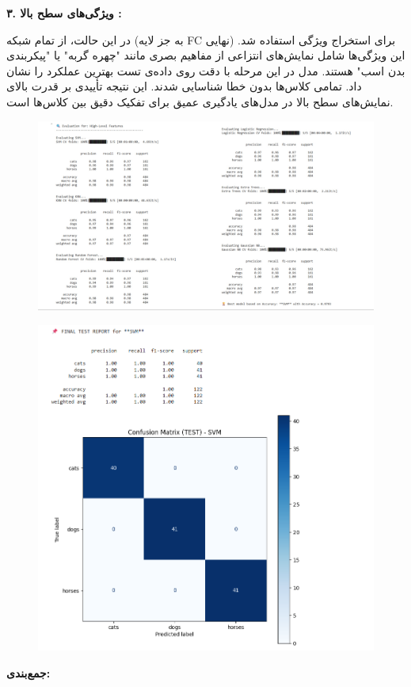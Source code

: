 \documentclass[a4paper,12pt]{article}
\begin{document}
\textbf{۳. ویژگی‌های سطح بالا :}

در این حالت، از تمام شبکه (به جز لایه FC نهایی) برای استخراج ویژگی استفاده شد. این ویژگی‌ها شامل نمایش‌های انتزاعی از مفاهیم بصری مانند "چهره گربه" یا "پیکربندی بدن اسب" هستند. مدل  در این مرحله با دقت  روی داده‌ی تست بهترین عملکرد را نشان داد. تمامی کلاس‌ها بدون خطا شناسایی شدند. این نتیجه تأییدی بر قدرت بالای نمایش‌های سطح بالا در مدل‌های یادگیری عمیق برای تفکیک دقیق بین کلاس‌ها است.

\begin{figure}[h]
	\centering
	\includegraphics[width=1\textwidth]{3-1.jpg}
\end{figure}
\FloatBarrier
\begin{figure}[h]
	\centering
	\includegraphics[width=1\textwidth]{3-2.png}
\end{figure}
\FloatBarrier
\vspace{0.5cm}
\textbf{جمع‌بندی:}
\end{document}

